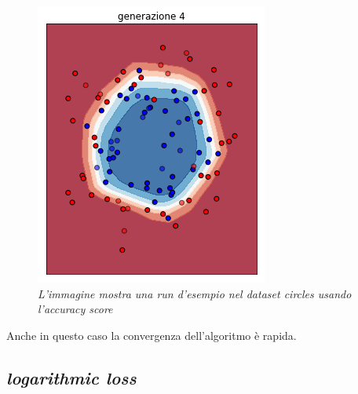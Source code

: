 \documentclass[12pt,a4paper]{report}
\begin{document}
\begin{figure}[H]
 \includegraphics[scale = 0.35]{images/circles-rnd-acc/4}
 \caption{\textit{L'immagine mostra una run d'esempio nel dataset circles usando l'accuracy score}}
 \label{circles1}
\end{figure}

Anche in questo caso la convergenza dell'algoritmo è rapida.

\subsection{\textit{logarithmic loss}}
\end{document}

